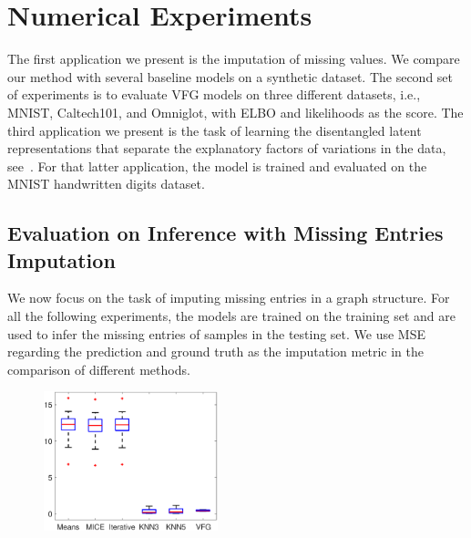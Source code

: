 \documentclass{article}
\begin{document}
\section{Numerical Experiments}\label{sec:numerical}
The first  application we present is the imputation of missing values. We compare our method with several baseline models  on a synthetic dataset.
The second set of experiments is to evaluate VFG models on three different datasets, i.e.,  MNIST, Caltech101, and Omniglot, with ELBO and likelihoods as the score.  
The third application we present is the task of learning the disentangled latent representations that separate the explanatory factors of variations in the data, see~\cite{bengio2013representation}.
For that latter application, the model is trained and evaluated on the MNIST handwritten digits dataset.
\subsection{Evaluation on Inference with Missing Entries Imputation}%
We now focus on the task of imputing missing entries in a graph structure.
For all the following experiments, the models are trained on the training set and are used to infer the missing entries of samples in the testing set. We use MSE  regarding the prediction and ground truth as the imputation metric in the comparison of different methods. 
\begin{figure}
       \includegraphics[width=0.45\textwidth]{fig/sim_box_t.eps}
    \label{fig:sim}
\end{figure}
\end{document}
